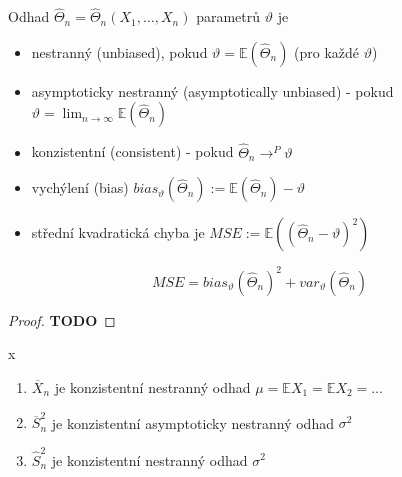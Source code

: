 \documentclass[../main.tex]{subfiles}
\begin{document}
\begin{definition}
    Odhad $\widehat{\Theta}_n = \widehat{\Theta}_n(X_1,\dots,X_n)$ parametrů $\vartheta$ je
    \begin{itemize}
        \item nestranný (unbiased), pokud $\vartheta = \mathbb{E}(\widehat{\Theta}_n)$ (pro každé $\vartheta$)
        \item asymptoticky nestranný (asymptotically unbiased) - pokud $\vartheta = \lim_{n \rightarrow \infty} \mathbb{E}(\widehat{\Theta}_n)$
        \item konzistentní (consistent) - pokud $\widehat{\Theta}_n \rightarrow^P \vartheta$
        \item vychýlení (bias) $bias_\vartheta
            (\widehat{\Theta}_n):=\mathbb{E}(\widehat{\Theta}_n) - \vartheta$
        \item střední kvadratická chyba je $MSE := \mathbb{E}((\widehat{\Theta}_n - \vartheta)^2)$
    \end{itemize}

\end{definition}
\begin{theorem}
    \[MSE = bias_\vartheta(\widehat{\Theta}_n)^2 + var_\vartheta(\widehat{\Theta}_n)\]
    \begin{proof}
        \textbf{TODO}
    \end{proof}
\end{theorem}
\begin{theorem}
    {\color{white} x}
    \begin{enumerate}
        \item $\overline{X}_n$ je konzistentní nestranný odhad $\mu = \mathbb{E}X_1 = \mathbb{E}X_2 =\dots$
        \item $\overline{S}^2_n$ je konzistentní asymptoticky nestranný odhad $\sigma^2$
        \item $\widehat{S}^2_n$ je konzistentní nestranný odhad $\sigma^2$
    \end{enumerate}
\end{theorem}
\end{document}
